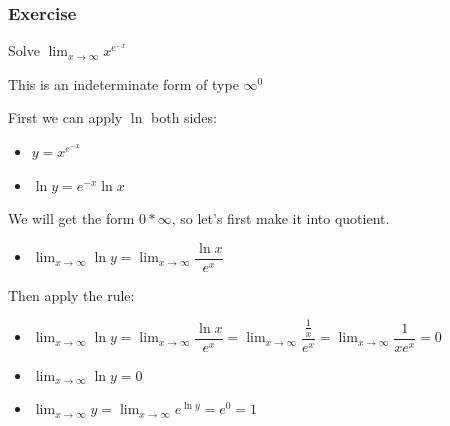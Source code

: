 \documentclass[t]{beamer}
\theoremstyle{plain}
\theoremstyle{definition}
\newcommand{\limm}[1]{\displaystyle \lim_{x\to #1}}
\begin{document}
\begin{frame}

\frametitle{Exercise}

\footnotesize

Solve $\limm{\infty}x^{e^{-x}}$

This is an indeterminate form of type $\infty^0$  \pause

\medskip

First we can apply $\ln$ both sides:

\begin{itemize}
	\item $y = x^{e^{-x}}$
	\item $\ln{y} = e^{-x}\ln{x}$
\end{itemize}

We will get the form $0 * \infty$, so let's first make it into quotient.

\begin{itemize}
	\item $\limm{\infty} \ln y = \limm{\infty} \dfrac{\ln{x}}{e^x}$
\end{itemize}

Then apply the rule:

\begin{itemize}
	\item $\limm{\infty} \ln y = \limm{\infty} \dfrac{\ln{x}}{e^x} = \limm{\infty} \dfrac{\frac{1}{x}}{e^x} = \limm{\infty}\dfrac{1}{xe^{x}} = 0$
	\item $\limm{\infty} \ln{y} = 0$
	\item $\limm{\infty}y = \limm{\infty} e^{\ln{y}} = e^{0} = 1$
\end{itemize}

\end{frame}
\end{document}
